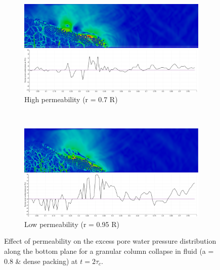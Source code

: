 \begin{figure}
\centering
\begin{subfigure}[t]{0.975\textwidth}
	\centering
    \includegraphics[width=\textwidth]{a08/r07_PWP_flow_dense}
    \caption{High permeability (r = 0.7 R)}
    \label{fig:r07_PWP_flow_dense}
\end{subfigure}
\\
\begin{subfigure}[t]{0.975\textwidth}
	\centering
    \includegraphics[width=\textwidth]{a08/r095_PWP_flow_dense}
    \caption{Low permeability (r = 0.95 R)}
    \label{fig:r095_PWP_flow_dense}
\end{subfigure}
\caption{Effect of permeability on the excess pore water pressure distribution 
along the bottom plane for a granular column collapse in fluid (a = 0.8 \& 
dense packing) at $t = 2\tau_c$.}
\label{fig:PWP_flow_dense}
\end{figure}


